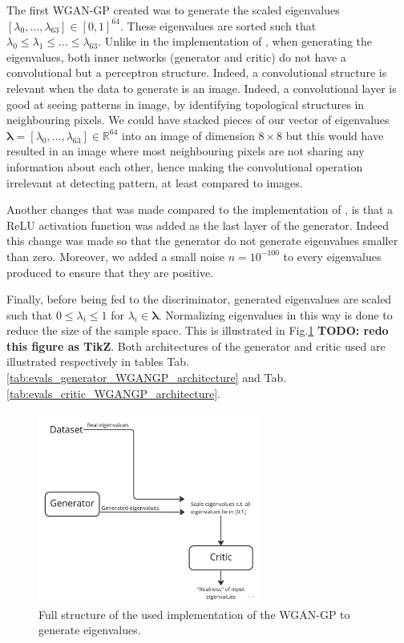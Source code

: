 \documentclass[11pt,a4paper,twoside]{report}
\begin{document}
The first WGAN-GP created was to generate the scaled eigenvalues $[\lambda_0, \dots, \lambda_{63}] \in [0,1]^{64}$. These eigenvalues are sorted such that $\lambda_0 \leq \lambda_1 \leq \dots \leq \lambda_{63}$. Unlike in the implementation of \cite{nain2020wgangp}, when generating the eigenvalues, both inner networks (generator and critic) do not have a convolutional but a perceptron structure. Indeed, a convolutional structure is relevant when the data to generate is an image. Indeed, a convolutional layer is good at seeing patterns in image, by identifying topological structures in neighbouring pixels. We could have stacked pieces of our vector of eigenvalues $\mathbf{\lambda} = [\lambda_0, \dots, \lambda_{63}] \in \mathbb{R}^{64}$  into an image of dimension $8 \times 8$ but this would have resulted in an image where most neighbouring pixels are not sharing any information about each other, hence making the convolutional operation irrelevant at detecting pattern, at least compared to images. 

Another changes that was made compared to the implementation of \cite{nain2020wgangp}, is that a ReLU activation function was added as the last layer of the generator. Indeed this change was made so that the generator do not generate eigenvalues smaller than zero. Moreover, we added a small noise $n = 10^{-100}$ to every eigenvalues produced to ensure that they are positive.

Finally, before being fed to the discriminator, generated eigenvalues are scaled such that $0 \leq \lambda_i \leq 1$ for $\lambda_i \in \mathbf{\lambda}$. Normalizing eigenvalues in this way is done to reduce the size of the sample space. This is illustrated in Fig.\ref{fig:flowchart_evals_wgangp} \textbf{TODO: redo this figure as TikZ}. Both architectures of the generator and critic used are illustrated respectively in tables Tab.\ref{tab:evals_generator_WGANGP_architecture} and Tab.\ref{tab:evals_critic_WGANGP_architecture}.

\begin{figure}
    \centering
    \includegraphics[width=0.65\textwidth]{figs/flowchart_evals_wgangp.jpg}
    \caption{Full structure of the used implementation of the WGAN-GP to generate eigenvalues.}
    \label{fig:flowchart_evals_wgangp}
\end{figure}
\end{document}
